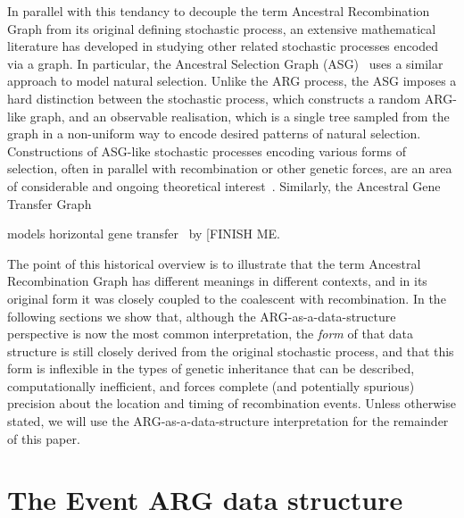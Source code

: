 \documentclass{article}
\begin{document}
In parallel with this tendancy to decouple the term
Ancestral Recombination Graph from its original defining stochastic process,
an extensive mathematical literature has developed in
studying other related stochastic processes encoded via a graph.
In particular, the Ancestral Selection Graph
(ASG)~\citep{krone1997ancestral,neuhauser1997genealogy}
uses a similar approach to model natural selection.
Unlike the ARG process, the ASG imposes a hard distinction between the stochastic process,
which constructs a random ARG-like graph, and an observable realisation,
which is a single tree sampled from the graph in a non-uniform way to encode desired
patterns of natural selection. 
Constructions of ASG-like stochastic processes encoding various
forms of selection, often in parallel with recombination or other genetic forces,
are an area of considerable and ongoing theoretical interest~\citep[e.g.][]{
neuhauser1999ancestral,
donnelly1999genealogical,
fearnhead2001perfect,
fearnhead2003ancestral,
etheridge2009coalescent,
gonzalezcasanova2018duality,
koskela2019robust}.
Similarly, the Ancestral Gene Transfer Graph

models horizontal gene transfer~\citep{baumdicker2014infinitely}
by [FINISH ME.

The point of this historical overview is to illustrate that the term
Ancestral Recombination Graph has different meanings in different
contexts, and in its original form it was closely coupled to
the coalescent with recombination. In the following sections we
show that, although the ARG-as-a-data-structure perspective is
now the most common interpretation, the \emph{form} of that
data structure is still closely derived from the original
stochastic process, and that this form is inflexible
in the types of genetic inheritance that can be described,
computationally inefficient, and
forces complete (and potentially spurious) precision about
the location and timing
of recombination events.
Unless otherwise stated, we will use the ARG-as-a-data-structure
interpretation for the remainder of this paper.

\section*{The Event ARG data structure}\label{eARG}
\end{document}

